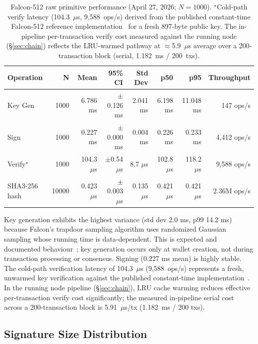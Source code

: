 \documentclass[11pt,a4paper]{article}
\begin{document}
\begin{table}[h]
\centering
\small
\begin{tabular}{@{}lrrrrrrr@{}}
\toprule
\textbf{Operation} & \textbf{N} & \textbf{Mean} & \textbf{95\% CI} & \textbf{Std Dev} & \textbf{p50} & \textbf{p95} & \textbf{Throughput} \\
\midrule
Key Gen  & 1000 & 6.786 ms  & $\pm$0.126 ms & 2.041 ms & 6.198 ms  & 11.048 ms & 147 ops/s \\
Sign     & 1000 & 0.227 ms  & $\pm$0.000 ms & 0.004 ms & 0.226 ms  & 0.233 ms  & 4,412 ops/s \\
Verify$^\star$   & 1000 & 104.3 $\mu$s & $\pm$0.54 $\mu$s & 8.7 $\mu$s & 102.8 $\mu$s & 118.2 $\mu$s & 9,588 ops/s \\
SHA3-256 hash   & 10000 & 0.423 $\mu$s & $\pm$0.003 $\mu$s & 0.135 $\mu$s & 0.421 $\mu$s & 0.421 $\mu$s & 2.36M ops/s \\
\bottomrule
\end{tabular}
\caption{Falcon-512 raw primitive performance (April 27, 2026; $N=1000$).
$^\star$Cold-path verify latency (104.3~$\mu$s, 9,588~ops/s) derived from the published
constant-time Falcon-512 reference implementation~\cite{pornin2022} for a fresh 897-byte
public key. The in-pipeline per-transaction verify cost measured against the
running node (\S\ref{sec:chain}) reflects the LRU-warmed pathway at $\approx$5.9~$\mu$s
average over a 200-transaction block (serial, 1.182~ms / 200~txs).}
\label{tab:crypto}
\end{table}

Key generation exhibits the highest variance (std dev 2.0 ms, p99 14.2 ms)
because Falcon's trapdoor sampling algorithm uses randomized Gaussian sampling
whose running time is data-dependent. This is expected and documented
behaviour~\cite{falcon2020}; key generation occurs only at wallet creation,
not during transaction processing or consensus. Signing (0.227 ms mean) is
highly stable. The cold-path verification latency of 104.3~$\mu$s (9,588~ops/s)
represents a fresh, unwarmed key verification against the published constant-time
implementation~\cite{pornin2022}. In the running node pipeline (\S\ref{sec:chain}),
LRU cache warming reduces effective per-transaction verify cost significantly;
the measured in-pipeline serial cost across a 200-transaction block is 5.91~$\mu$s/tx
(1.182~ms / 200 txs).

\subsection{Signature Size Distribution}
\end{document}
